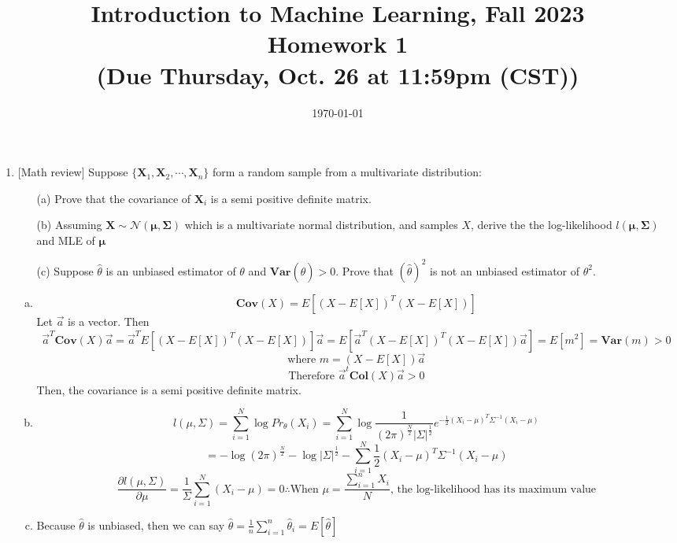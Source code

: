 \documentclass[10pt]{article}
\begin{document}
\date{\today}
\title{Introduction to Machine Learning, Fall 2023 \\
	Homework 1\\
	\small (Due Thursday, Oct. 26 at 11:59pm (CST))}
\maketitle
\begin{enumerate}[1.]


	\item
	 [Math review] Suppose $\{\mathbf{X}_1, \mathbf{X}_2, \cdots, \mathbf{X}_n\}$ form a random sample from a multivariate distribution:
		\begin{itemize}
			\item[(a)] Prove that the covariance of $\mathbf{X}_i$ is a semi positive definite matrix. ~
			\item[(b)] Assuming $\mathbf{X}\sim \mathcal{N}(\mathbf{\mu},\mathbf{\Sigma})$ which is a multivariate normal distribution, and samples $X$, derive the the log-likelihood $\mathit{l}(\mathbf{\mu},\mathbf{\Sigma})$ and MLE of $\mathbf{\mu}$ ~
			\item[(c)] Suppose $\hat{\theta}$ is an unbiased estimator of $\theta$ and $\mathbf{Var}(\hat{\theta})>0$. Prove that $(\hat{\theta})^2$ is not an unbiased estimator of $\theta^2$. ~
		\end{itemize}
		
		\begin{enumerate}[(a)]
			\item 
			$$\mathbf{Cov}(X)=E[(X-E[X])^T(X-E[X])]$$
			Let $\vec a$ is a vector. Then 
			$$\vec a^T\mathbf{Cov}(X)\vec a=\vec a^TE[(X-E[X])^T(X-E[X])]\vec a=E[\vec a^T(X-E[X])^T(X-E[X])\vec a]=E[m^2]=\mathbf{Var}(m)>0$$
			$$\mbox{where }m=(X-E[X])\vec a$$
			$$\mbox{Therefore }\vec a^t\mathbf{Col}(X)\vec a>0$$
			Then, the covariance is a semi positive definite matrix.
			\item
			$$l(\mu,\Sigma)=\sum_{i=1}^N\log Pr_\theta(X_i)=\sum_{i=1}^N\log\frac{1}{(2\pi)^\frac N2|\Sigma|^\frac12}e^{-\frac{1}{2}(X_i-\mu)^T\Sigma^{-1}(X_i-\mu)}$$
			$$=-\log(2\pi)^\frac N2-\log|\Sigma|^\frac12-\sum_{i=1}^N\frac12(X_i-\mu)^T\Sigma^{-1}(X_i-\mu)$$
			$$\frac{\partial l(\mu,\Sigma)}{\partial\mu}=\frac{1}{\Sigma}\sum_{i=1}^N(X_i-\mu)=0\therefore\text{When }\mu=\frac{\sum_{i=1}^nX_i}{N}\text{, the log-likelihood has its maximum value}$$
			\item 
			Because $\hat\theta$ is unbiased, then we can say $\hat\theta=\frac1n\sum_{i=1}^n\hat\theta_i=E[\hat\theta]$
			

\end{enumerate}
\end{enumerate}
\end{document}
